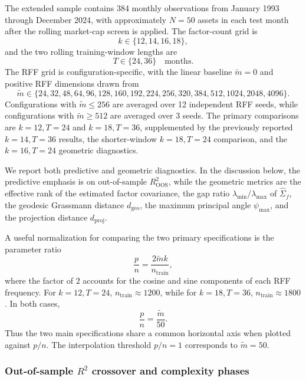 \documentclass[11pt,letterpaper]{article}
\begin{document}
The extended sample contains 384 monthly observations from January 1993 through
December 2024, with approximately $N=50$ assets in each test month after the
rolling market-cap screen is applied. The
factor-count grid is
\begin{equation*}
k \in \{12,14,16,18\},
\end{equation*}
and the two rolling training-window lengths are
\begin{equation*}
T \in \{24,36\}\quad\text{months}.
\end{equation*}
The RFF grid is configuration-specific, with the linear baseline
$\tilde m=0$ and positive RFF dimensions drawn from
\begin{equation*}
\tilde m \in
\{24,32,48,64,96,128,160,192,224,256,320,384,512,1024,2048,4096\}.
\end{equation*}
Configurations with $\tilde m\leq 256$ are averaged over 12 independent RFF seeds,
while configurations with $\tilde m\geq 512$ are averaged over 3 seeds. The primary
comparisons are $k=12,T=24$ and $k=18,T=36$, supplemented by the previously
reported $k=14,T=36$ results, the shorter-window $k=18,T=24$ comparison, and
the $k=16,T=24$ geometric diagnostics.

We report both predictive and geometric diagnostics. In the discussion below,
the predictive emphasis is on out-of-sample $R^2_{\mathrm{OOS}}$, while the
geometric metrics are the effective rank of the estimated factor covariance,
the gap ratio $\lambda_{\min}/\lambda_{\max}$ of $\hat\Sigma_f$, the
geodesic Grassmann distance $d_{\mathrm{geo}}$, the maximum principal angle
$\psi_{\max}$, and the projection distance $d_{\mathrm{proj}}$.

A useful normalization for comparing the two primary specifications is the
parameter ratio
\begin{equation*}
\frac{p}{n}
=
\frac{2\tilde m k}{n_{\mathrm{train}}},
\end{equation*}
where the factor of $2$ accounts for the cosine and sine components of each
RFF frequency. For $k=12,T=24$, $n_{\mathrm{train}}\approx 1200$, while for
$k=18,T=36$, $n_{\mathrm{train}}\approx 1800$. In both cases,
\begin{equation*}
\frac{p}{n}=\frac{\tilde m}{50}.
\end{equation*}
Thus the two main specifications share a common horizontal axis when plotted
against $p/n$. The interpolation threshold $p/n=1$ corresponds to
$\tilde m=50$.

\subsubsection{Out-of-sample \texorpdfstring{$R^2$}{R2} crossover and complexity phases}
\label{sec:extended:r2}
\end{document}
